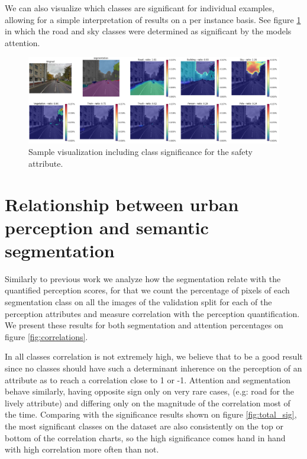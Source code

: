 We can also visualize which classes are significant for individual examples, allowing
for a simple interpretation of results on a per instance basis.
See figure \ref{fig:ratio} in which the road and sky classes were determined as significant
by the models attention.

\begin{figure}[ht]
	\begin{center}
	\includegraphics[width=1\textwidth]{./figures/ratio.png}
	\caption[Example of significance ratio]{
        Sample visualization including class significance for the safety attribute.
        }
	\label{fig:ratio}
	\end{center}
\end{figure}


\section{Relationship between urban perception and semantic segmentation}

Similarly to previous work \cite{rossetti, zhang_measuring} we analyze how the segmentation relate with the quantified
perception scores, for that we count the percentage of pixels of each segmentation class
on all the images of the validation split for each of the perception attributes and measure
correlation with the perception quantification. We present these results for both
segmentation and attention percentages on figure \ref{fig:correlations}.

In all classes correlation is not extremely high, we believe that to be a good result since
no classes should have such a determinant inherence on the perception of an attribute as to
reach a correlation close to 1 or -1. Attention and segmentation behave similarly, having
opposite sign only on very rare cases, (e.g: road for the lively attribute) and differing
only on the magnitude of the correlation most of the time. Comparing with the significance results shown
on figure \ref{fig:total_sig}, the most significant classes on the dataset are also consistently on
the top or bottom of the correlation charts, so the high significance comes hand in hand with
high correlation more often than not.


